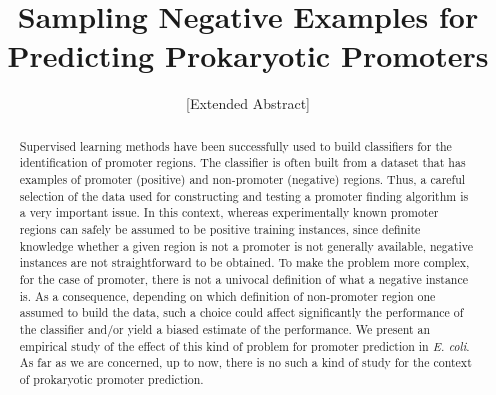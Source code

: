 \documentclass{sig-alternate}
\theoremstyle{plain}
\begin{document}
%

\title{Sampling Negative Examples for Predicting Prokaryotic Promoters}
\subtitle{[Extended Abstract]}


\author{
\alignauthor 
}

\maketitle
\begin{abstract} 
Supervised learning methods have been successfully used to build classifiers for the identification of promoter regions. The classifier is often built from a dataset that has examples of promoter (positive) and non-promoter  (negative)  regions.  Thus, a careful selection of the data  used for constructing and testing a promoter finding algorithm is a very important issue.  In this context, whereas experimentally known promoter regions can safely be assumed to be positive training instances,   since  definite knowledge whether a given region is not a promoter  is not generally available,  negative instances are not straightforward to be obtained. To make the problem more complex, for the case of promoter, there is not  a univocal definition of what a negative instance is. As a consequence, depending on which definition of non-promoter region one assumed to  build  the data, such a choice  could affect  significantly the performance of the classifier and/or yield a biased estimate of the performance. We present an empirical study of the effect of this kind of problem for promoter prediction in {\it E. coli}. As far as we are concerned, up to now, there is no such a  kind of study for the context of prokaryotic promoter prediction.
\end{abstract}
\end{document}
